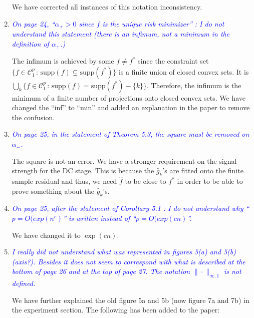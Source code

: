 \documentclass[pdftex,12pt]{article}
\let\hat\widehat
\def\rc#1{{\it\textcolor{blue}{#1}}\smallskip}
\begin{document}
\begin{enumerate}
We have corrected all instances of this notation inconsistency.


\item \rc{On page 24, ``$\alpha_{+} > 0$ since $f$ is the unique risk minimizer'' : I do
not understand this statement (there is an infimum, not a minimum in
the definition of $\alpha_{+}$.)}

The infimum is achieved by some $f \neq f^*$ since the constraint set $\{ f \in \mathcal{C}^p_1 \,:\, \textrm{supp}(f) \subsetneq \textrm{supp}(f^*)\}$ is a finite union of closed convex sets. It is $\bigcup_k \{ f \in \mathcal{C}^p_1 \,:\, \textrm{supp}(f) = \textrm{supp}(f^*) - \{k\}\}$. Therefore, the infimum is the minimum of a finite number of projections onto closed convex sets. We have changed the ``inf'' to ``min'' and added an explanation in the paper to remove the confusion.


\item \rc{On page 25, in the statement of Theorem 5.3, the square must be
removed on $\alpha_-$.}

The square is not an error. We have a stronger requirement on the signal strength for the DC stage. This is because the $\hat{g}_k$'s are fitted onto the finite sample residual and thus, we need $\hat{f}$ to be close to $f^*$ in order to be able to prove something about the $\hat{g}_k$'s.

\item \rc{On page 25, after the statement of Corollary 5.1 : I do not understand
why ``$p = O(exp(n^c)$'' is written instead of ``$p = O(exp(cn)$''.}

We have changed it to $\exp(cn)$.


\item \rc{I really did not understand what was represented in figures 5(a) and
5(b) (axis?). Besides it does not seem to correspond with what is
described at the bottom of page 26 and at the top of page 27. The
notation $\|\cdot\|_{\infty,1}$ is not defined.}

We have further explained the old figure 5a and 5b (now figure 7a and 7b) in the experiment section. The following has been added to the paper:


\end{enumerate}
\end{document}
